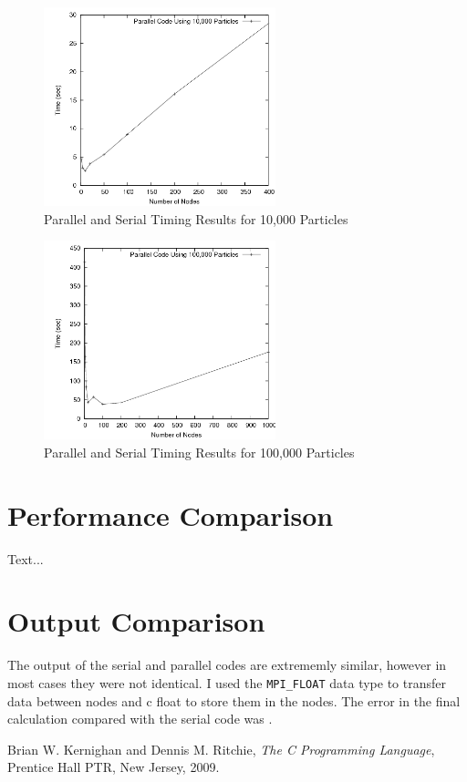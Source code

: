 \documentclass{article}
\begin{document}
\begin{figure}
\centering
\includegraphics[width=0.6\textwidth]{img/timing_data_10000_particles.png}
\caption{Parallel and Serial Timing Results for 10,000 Particles}
\label{chart2}
\end{figure}

\begin{figure}
\centering
\includegraphics[width=0.6\textwidth]{img/timing_data_100000_particles.png}
\caption{Parallel and Serial Timing Results for 100,000 Particles}
\label{chart3}
\end{figure}

\section{Performance Comparison}
Text...

\section{Output Comparison}
The output of the serial and parallel codes are extrememly similar, however in most cases they were not identical. I used the \verb!MPI_FLOAT! data type to transfer data between nodes and c float to store them in the nodes. The error in the final calculation compared with the serial code was .

\begin{thebibliography}{9}

  Brian W. Kernighan and Dennis M. Ritchie,
  \emph{The C Programming Language},
  Prentice Hall PTR, New Jersey,
  2009.

\end{thebibliography}
\end{document}
